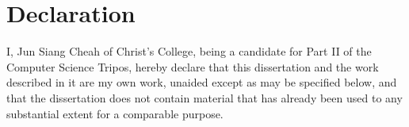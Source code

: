 \documentclass[final,dissertation.tex]{subfiles}
\begin{document}
\section*{Declaration}

I, Jun Siang Cheah of Christ's College, being a candidate for Part II of the Computer
Science Tripos, hereby declare that this dissertation and the work described in it are my own work,
unaided except as may be specified below, and that the dissertation
does not contain material that has already been used to any substantial
extent for a comparable purpose.

\bigskip
{}

\medskip
{}
\end{document}
